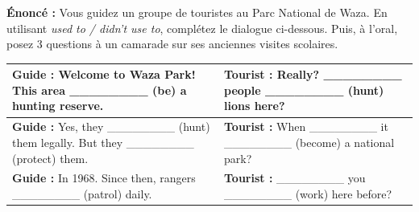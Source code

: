 \documentclass[11pt]{article}
\begin{document}
\begin{exoresolu}
\textbf{Énoncé :} Vous guidez un groupe de touristes au Parc National de Waza. En utilisant \emph{used to / didn't use to}, complétez le dialogue ci-dessous. Puis, à l'oral, posez 3 questions à un camarade sur ses anciennes visites scolaires.

\begin{center}
\begin{tabularx}{\linewidth}{|X|X|}\hline
\textbf{Guide :} Welcome to Waza Park! This area \_\_\_\_\_\_\_\_ (be) a hunting reserve. & \textbf{Tourist :} Really? \_\_\_\_\_\_\_\_ people \_\_\_\_\_\_\_\_ (hunt) lions here? \\ \hline
\textbf{Guide :} Yes, they \_\_\_\_\_\_\_\_ (hunt) them legally. But they \_\_\_\_\_\_\_\_ (protect) them. & \textbf{Tourist :} When \_\_\_\_\_\_\_\_ it \_\_\_\_\_\_\_\_ (become) a national park? \\ \hline
\textbf{Guide :} In 1968. Since then, rangers \_\_\_\_\_\_\_\_ (patrol) daily. & \textbf{Tourist :} \_\_\_\_\_\_\_\_ you \_\_\_\_\_\_\_\_ (work) here before? \\ \hline
\end{tabularx}
\end{center}


\end{exoresolu}
\end{document}
